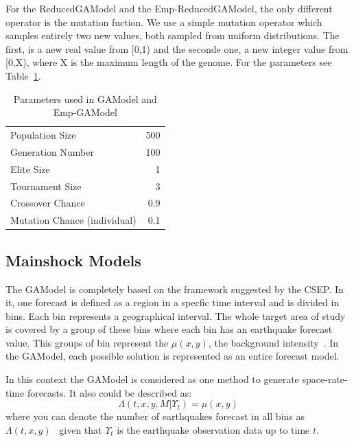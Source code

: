 For the ReducedGAModel and the Emp-ReducedGAModel, the only different
operator is the mutation fuction. We use a simple mutation operator
which samples entirely two new values, both sampled from uniform
distributions. The first, is a new real value from [0,1) and the
seconde one, a new integer value from [0,X), where X is the maximum
length of the genome. For the parameters see
Table~\ref{GAHParameters}.

\begin{table}[!ht]
  \caption{Parameters used in GAModel and Emp-GAModel}
  \label{GAHParameters}
  \begin{center}
  \begin{tabular}{|l|r|}
    \hline
    Population Size & 500\\
    Generation Number & 100\\
    Elite Size & 1\\
    Tournament Size & 3\\
    Crossover Chance & 0.9\\
    Mutation Chance (individual) & 0.1\\
    \hline    
  \end{tabular}
  \end{center}
\end{table}

\subsection{Mainshock Models}
The GAModel is completely based on the framework suggested by the
CSEP. In it, one forecast is defined as a region in a specfic time
interval and is divided in bins. Each bin represents a geographical
interval. The whole target area of study is covered by a group of
these bins where each bin has an earthquake forecast value. This
groups of bin represent the $\mu(x,y)$, the background
intensity~\cite{zhuang2004analyzing}. In the GAModel, each possible
solution is represented as an entire forecast model.

In this context the GAModel is considered as one method to generate
space-rate-time forecasts. It also could be described as:
\begin{equation}\label{gamodel}
 \Lambda(t,x,y,M|\Upsilon_t) = \mu(x,y)
\end{equation}
where you can denote the number of earthquakes forecast in all bins 
as $\Lambda(t,x,y)$~\cite{zechar2010evaluating} given that $\Upsilon_t$ 
is the earthquake observation data up to time $t$.



